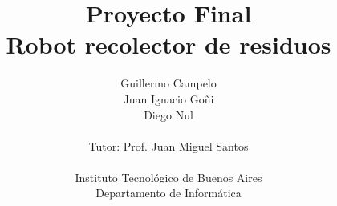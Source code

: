 \documentclass[a4paper,10pt]{article}
\title{Proyecto Final\\Robot recolector de residuos}
\author{Guillermo Campelo\\Juan Ignacio Go\~ni\\Diego Nul\\ \\Tutor: Prof. Juan Miguel Santos\\ \\Instituto Tecnol\'ogico de Buenos Aires\\Departamento de Inform\'atica}
\begin{document}
\maketitle



\newpage

\tableofcontents

\newpage

\listoftables

\newpage

\listoffigures

\newpage



\newpage



\newpage



\newpage



\newpage



\newpage



\newpage



\nocite{*}
\newpage


\end{document}
